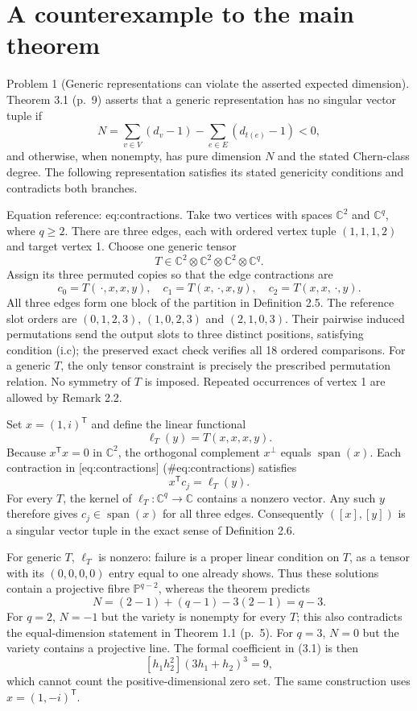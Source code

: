 \documentclass[10pt]{article}
\begin{document}
\section*{A counterexample to the main theorem}
Problem 1 (Generic representations can violate the asserted expected dimension).  Theorem 3.1 (p. 9) asserts that a generic representation has no singular vector tuple if \[N=\sum_{v\in V}(d_v-1)-\sum_{e\in E}(d_{t(e)}-1)<0,\] and otherwise, when nonempty, has pure dimension \(N\) and the stated Chern-class degree. The following representation satisfies its stated genericity conditions and contradicts both branches.\par
Equation reference: eq:contractions. Take two vertices with spaces \(\mathbb C^2\) and \(\mathbb C^q\), where \(q\geq2\). There are three edges, each with ordered vertex tuple \((1,1,1,2)\) and target vertex 1. Choose one generic tensor \[T\in\mathbb C^2\otimes\mathbb C^2\otimes\mathbb C^2\otimes\mathbb C^q.\] Assign its three permuted copies so that the edge contractions are \[
c_0=T(\,\cdot,x,x,y),\quad
c_1=T(x,\,\cdot,x,y),\quad
c_2=T(x,x,\,\cdot,y).\] All three edges form one block of the partition in Definition 2.5. The reference slot orders are \((0,1,2,3)\), \((1,0,2,3)\) and \((2,1,0,3)\). Their pairwise induced permutations send the output slots to three distinct positions, satisfying condition (i.c); the preserved exact check verifies all 18 ordered comparisons. For a generic \(T\), the only tensor constraint is precisely the prescribed permutation relation. No symmetry of \(T\) is imposed. Repeated occurrences of vertex 1 are allowed by Remark 2.2.\par
Set \(x=(1,i)^{\mathsf T}\) and define the linear functional \[\ell_T(y)=T(x,x,x,y).\] Because \(x^{\mathsf T}x=0\) in \(\mathbb C^2\), the orthogonal complement \(x^\perp\) equals \(\operatorname{span}(x)\). Each contraction in [eq:contractions] (\#eq:contractions) satisfies \[x^{\mathsf T}c_j=\ell_T(y).\] For every \(T\), the kernel of \(\ell_T:\mathbb C^q\to\mathbb C\) contains a nonzero vector. Any such \(y\) therefore gives \(c_j\in\operatorname{span}(x)\) for all three edges. Consequently \(([x],[y])\) is a singular vector tuple in the exact sense of Definition 2.6.\par
For generic \(T\), \(\ell_T\) is nonzero: failure is a proper linear condition on \(T\), as a tensor with its \((0,0,0,0)\) entry equal to one already shows. Thus these solutions contain a projective fibre \(\mathbb P^{q-2}\), whereas the theorem predicts \[N=(2-1)+(q-1)-3(2-1)=q-3.\] For \(q=2\), \(N=-1\) but the variety is nonempty for every \(T\); this also contradicts the equal-dimension statement in Theorem 1.1 (p. 5). For \(q=3\), \(N=0\) but the variety contains a projective line. The formal coefficient in (3.1) is then \[[h_1h_2^2](3h_1+h_2)^3=9,\] which cannot count the positive-dimensional zero set. The same construction uses \(x=(1,-i)^{\mathsf T}\).\par
\end{document}
